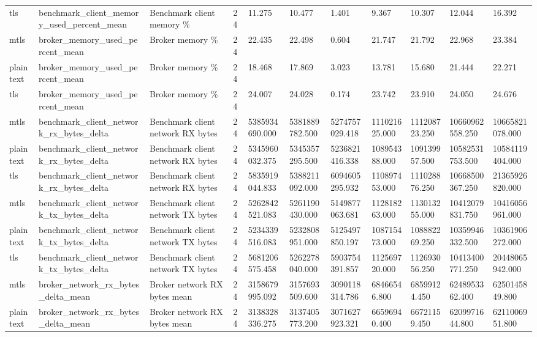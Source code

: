 \begin{longtable}{lllllllllll}
tls & benchmark\_client\_memory\_used\_percent\_mean & Benchmark client memory \% & 24 & 11.275 & 10.477 & 1.401 & 9.367 & 10.307 & 12.044 & 16.392 \\
mtls & broker\_memory\_used\_percent\_mean & Broker memory \% & 24 & 22.435 & 22.498 & 0.604 & 21.747 & 21.792 & 22.968 & 23.384 \\
plaintext & broker\_memory\_used\_percent\_mean & Broker memory \% & 24 & 18.468 & 17.869 & 3.023 & 13.781 & 15.680 & 21.444 & 22.271 \\
tls & broker\_memory\_used\_percent\_mean & Broker memory \% & 24 & 24.007 & 24.028 & 0.174 & 23.742 & 23.910 & 24.050 & 24.676 \\
mtls & benchmark\_client\_network\_rx\_bytes\_delta & Benchmark client network RX bytes & 24 & 5385934690.000 & 5381889782.500 & 5274757029.418 & 111021625.000 & 111208723.250 & 10660962558.250 & 10665821078.000 \\
plaintext & benchmark\_client\_network\_rx\_bytes\_delta & Benchmark client network RX bytes & 24 & 5345960032.375 & 5345357295.500 & 5236821416.338 & 108954388.000 & 109139957.500 & 10582531753.500 & 10584119404.000 \\
tls & benchmark\_client\_network\_rx\_bytes\_delta & Benchmark client network RX bytes & 24 & 5835919044.833 & 5388211092.000 & 6094605295.932 & 110897453.000 & 111028876.250 & 10668500367.250 & 21365926820.000 \\
mtls & benchmark\_client\_network\_tx\_bytes\_delta & Benchmark client network TX bytes & 24 & 5262842521.083 & 5261190430.000 & 5149877063.681 & 112818263.000 & 113013255.000 & 10412079831.750 & 10416056961.000 \\
plaintext & benchmark\_client\_network\_tx\_bytes\_delta & Benchmark client network TX bytes & 24 & 5234339516.083 & 5232808951.000 & 5125497850.197 & 108715473.000 & 108882269.250 & 10359946332.500 & 10361906272.000 \\
tls & benchmark\_client\_network\_tx\_bytes\_delta & Benchmark client network TX bytes & 24 & 5681206575.458 & 5262278040.000 & 5903754391.857 & 112569720.000 & 112693056.250 & 10413400771.250 & 20448065942.000 \\
mtls & broker\_network\_rx\_bytes\_delta\_mean & Broker network RX bytes mean & 24 & 3158679995.092 & 3157693509.600 & 3090118314.786 & 68466546.800 & 68599124.450 & 6248953362.400 & 6250145849.800 \\
plaintext & broker\_network\_rx\_bytes\_delta\_mean & Broker network RX bytes mean & 24 & 3138328336.275 & 3137405773.200 & 3071627923.321 & 66596940.400 & 66721159.450 & 6209971644.800 & 6211006951.800 \\

\end{longtable}
